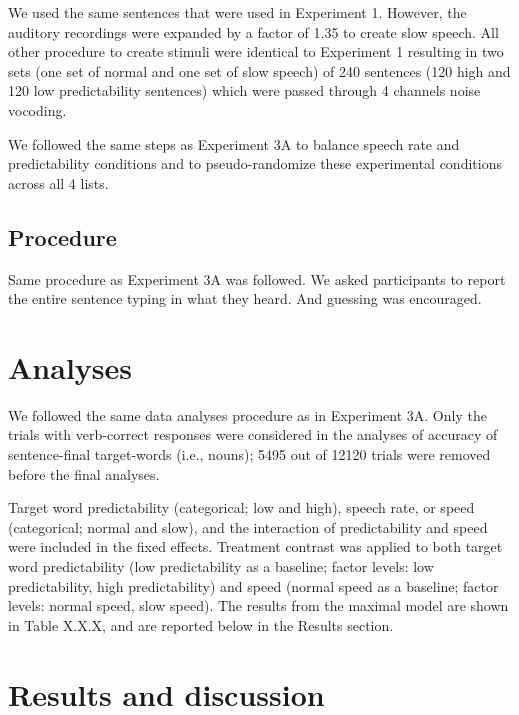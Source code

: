 \documentclass[a4paper, nobind]{templates/ociamthesis}
\begin{document}
We used the same sentences that were used in Experiment 1. However, the auditory recordings were expanded by a factor of 1.35 to create slow speech. All other procedure to create stimuli were identical to Experiment 1 resulting in two sets (one set of normal and one set of slow speech) of 240 sentences (120 high and 120 low predictability sentences) which were passed through 4 channels noise vocoding.

We followed the same steps as Experiment 3A to balance speech rate and predictability conditions and to pseudo-randomize these experimental conditions across all 4 lists.

\hypertarget{procedure-4}{%
\subsection{Procedure}\label{procedure-4}}

Same procedure as Experiment 3A was followed.
We asked participants to report the entire sentence typing in what they heard.
And guessing was encouraged.

\hypertarget{analyses-4}{%
\section{Analyses}\label{analyses-4}}

We followed the same data analyses procedure as in Experiment 3A.
Only the trials with verb-correct responses were considered in the analyses of accuracy of sentence-final target-words (i.e., nouns); 5495 out of 12120 trials were removed before the final analyses.

Target word predictability (categorical; low and high), speech rate, or speed (categorical; normal and slow), and the interaction of predictability and speed were included in the fixed effects.
Treatment contrast was applied to both target word predictability (low predictability as a baseline; factor levels: low predictability, high predictability) and speed (normal speed as a baseline; factor levels: normal speed, slow speed).
The results from the maximal model are shown in Table X.X.X, and are reported below in the Results section.

\hypertarget{results-and-discussion-4}{%
\section{Results and discussion}\label{results-and-discussion-4}}
\end{document}

